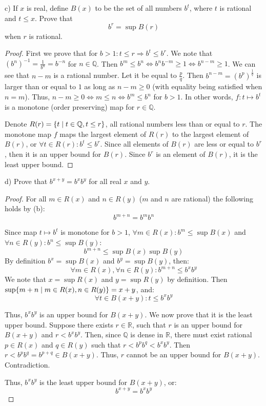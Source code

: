 \documentclass{article}
\newcommand{\R}{\mathbb{R}}
\newcommand{\Q}{\mathbb{Q}}
\DeclarePairedDelimiter{\set}{ \{ }{ \} }
\begin{document}
\begin{tcolorbox}
c) If $x$ is real, define $B(x)$ to be the set of all numbers $b^t$, where $t$ is rational and $t \leq x$.
Prove that
\[ b^r = \sup B(r) \]
when $r$ is rational.
\end{tcolorbox}

\begin{proof}

First we prove that for $b>1 : t \leq r \Rightarrow b^t \leq b^r$.
We note that $(b^n)^{-1} = \frac{1}{b^n} = b^{-n}$ for $n \in \Q$.
Then $b^m \leq b^n \iff b^n b^{-m} \geq 1 \iff b^{n-m} \geq 1$.
We can see that $n-m$ is a rational number. Let it be equal to $\frac{p}{q}$.
Then $b^{n-m} = (b^p)^{\frac{1}{q}}$ is larger than or equal to $1$ as long as $n-m \geq 0$ (with equality being satisfied when $n=m$).
Thus, $n-m \geq 0 \iff m \leq n \iff b^m \leq b^n$ for $b>1$.
In other words, $f: t \mapsto b^t$ is a monotone (order preserving) map for $r \in \Q$.

Denote $R(r) = \set{t \mid t \in \Q, t \leq r }$, all rational numbers less than or equal to $r$.
The monotone map $f$ maps the largest element of $R(r)$ to the largest element of $B(r)$, or $\forall t \in R(r): b^t \leq b^r$.
Since all elements of $B(r)$ are less or equal to $b^r$, then it is an upper bound for $B(r)$.
Since $b^r$ is an element of $B(r)$, it is the least upper bound.

\end{proof}

\begin{tcolorbox}
d) Prove that $b^{x+y} = b^x b^y$ for all real $x$ and $y$.
\end{tcolorbox}

\begin{proof}

For all $m \in R(x)$ and $n \in R(y)$ ($m$ and $n$ are rational) the following holds by (b):
\[ b^{m+n} = b^m b^n \]

Since map $t \mapsto b^t$ is monotone for $b>1$, $\forall m \in R(x) : b^m \leq \sup B(x)$ and $\forall n \in R(y) : b^n \leq \sup B(y)$:
\[ b^{m+n} \leq \sup B(x) \sup B(y) \]
By definition $b^x = \sup B(x)$ and $b^y = \sup B(y)$, then:
\[ \forall m \in R(x), \forall n \in R(y) : b^{m+n} \leq b^x b^y \]
We note that $x = \sup R(x)$ and $y = \sup R(y)$ by definition.
Then $\sup \set{ m+n \mid m \in R(x), n \in R(y)} = x+y$, and:
\[ \forall t \in B(x+y): t \leq b^x b^y \]

Thus, $b^x b^y$ is an upper bound for $B(x+y)$.
We now prove that it is the least upper bound.
Suppose there exists $r \in \R$, such that $r$ is an upper bound for $B(x+y)$ and $r < b^x b^y$.
Then, since $\Q$ is dense in $\R$, there must exist rational $p \in R(x)$ and $q \in R(y)$ such that $r < b^p b^q < b^x b^y$.
Then $r < b^p b^q = b^{p+q} \in B(x+y)$.
Thus, $r$ cannot be an upper bound for $B(x+y)$.
Contradiction.

Thus, $b^x b^y$ is the least upper bound for $B(x+y)$, or:
\[ b^{x+y} = b^x b^y \]

\end{proof}
\end{document}
